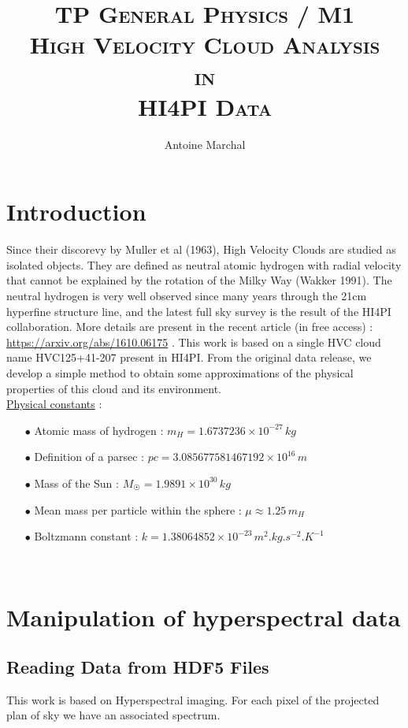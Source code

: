 \documentclass[a4paper,10.5pt]{report}
\title{{\textsc{\Large{TP General Physics / M1}\\ [3cm]
      \textbf{\LARGE{High Velocity Cloud Analysis \\ in \\ HI4PI Data}}}} \\[2cm]}
\author{Antoine Marchal \\ [1cm]}
\date{}
\begin{document}
\begin{titlingpage}
\maketitle
\end{titlingpage}
\newpage

\newpage
\chapter*{Introduction}
Since their discorevy by Muller et al (1963), High Velocity Clouds are studied as isolated objects. They are defined 
as neutral atomic hydrogen with radial velocity that cannot be explained by the rotation of the Milky Way (Wakker 1991).   
The neutral hydrogen is very well observed since many years through the 
21cm hyperfine structure line, and the latest full sky survey is the result of the HI4PI collaboration. 
More details are present in the recent article (in free access) : 
\color{blue} \url{https://arxiv.org/abs/1610.06175} \color{black}. 
This work is based on a single HVC cloud name HVC125+41-207 present in HI4PI. From the original data release, we develop a simple
method to obtain some approximations of the physical properties of this cloud and its environment. \\

\noindent
\underline{Physical constants} : \\
\begin{itemize}
\item[$\bullet$] Atomic mass of hydrogen : $m_H = 1.6737236 \times 10^{-27} \, kg$ 
\item[$\bullet$] Definition of a parsec : $pc = 3.085677581467192 \times 10^{16} \, m$
\item[$\bullet$] Mass of the Sun : $M_{\astrosun} = 1.9891 \times 10^{30} \, kg$
\item[$\bullet$] Mean mass per particle within the sphere : $\mu \approx 1.25 \, m_H$
\item[$\bullet$] Boltzmann constant : $k = 1.38064852 \times 10^{-23} \, m^2.kg.s^{-2}.K^{-1}$ 
\end{itemize} \\

\chapter{Manipulation of hyperspectral data}
\section{Reading Data from HDF5 Files}
This work is based on Hyperspectral imaging. For each pixel of the projected plan of sky we have an associated spectrum. \\
\end{document}
